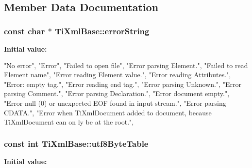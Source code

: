 \subsection{Member Data Documentation}
\hypertarget{class_ti_xml_base_a7ac8feec4100e446b3d78e1ac0659700}{
\subsubsection[{errorString}]{\setlength{\rightskip}{0pt plus 5cm}const char $\ast$ TiXmlBase::errorString}}
\label{class_ti_xml_base_a7ac8feec4100e446b3d78e1ac0659700}
{\bfseries Initial value:}
\begin{DoxyCode}

{
        "No error",
        "Error",
        "Failed to open file",
        "Error parsing Element.",
        "Failed to read Element name",
        "Error reading Element value.",
        "Error reading Attributes.",
        "Error: empty tag.",
        "Error reading end tag.",
        "Error parsing Unknown.",
        "Error parsing Comment.",
        "Error parsing Declaration.",
        "Error document empty.",
        "Error null (0) or unexpected EOF found in input stream.",
        "Error parsing CDATA.",
        "Error when TiXmlDocument added to document, because TiXmlDocument can on
      ly be at the root.",
}
\end{DoxyCode}
\hypertarget{class_ti_xml_base_ac8c86058137bdb4b413c3eca58f2d467}{
\subsubsection[{utf8ByteTable}]{\setlength{\rightskip}{0pt plus 5cm}const int TiXmlBase::utf8ByteTable}}
\label{class_ti_xml_base_ac8c86058137bdb4b413c3eca58f2d467}
{\bfseries Initial value:}
